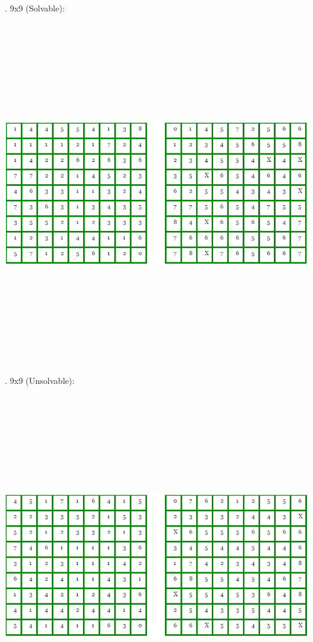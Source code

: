 \documentclass[12pt, letterpaper]{article}
\begin{document}
\bigskip	
{}. 9x9 (Solvable):
	
{\centering
	\includegraphics[width=15cm, height=15cm, keepaspectratio]{"Task 2/9x9 Puzzle (Solvable)"}
\par}
	
\bigskip
{}. 9x9 (Unsolvable):
	
{\centering
	\includegraphics[width=15cm, height=15cm, keepaspectratio]{"Task 2/9x9 Puzzle (Unsolvable)"}
\par}
\end{document}
